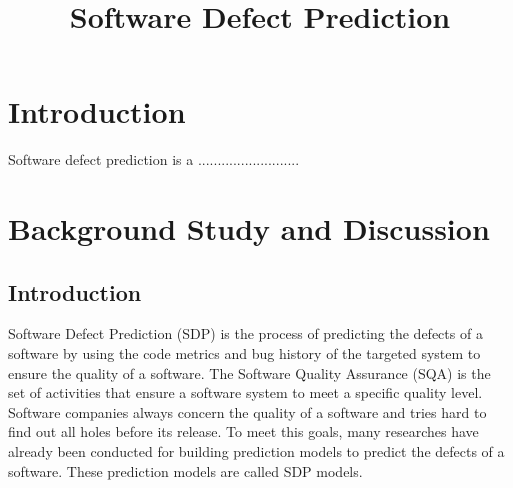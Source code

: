 \documentclass[12pt]{report}
\begin{document}
\doublespacing
\title{ Software Defect Prediction}
\date{}
\maketitle
%
%
%
%
%
%
%
\chapter{Introduction}
Software defect prediction is a ..........................
\chapter{Background Study and Discussion}
\section{Introduction}

Software Defect Prediction (SDP) is the process of predicting the defects of a software by using the code metrics and bug history of the  targeted system to ensure the quality of a software. The Software Quality Assurance (SQA) is the set of activities that ensure a software system to meet a specific quality level. Software companies always concern the quality of a software and tries hard to find out all holes before its release. To meet this goals, many researches have already been conducted for building prediction models to predict the defects of a software. These prediction models are called SDP models.
\end{document}
